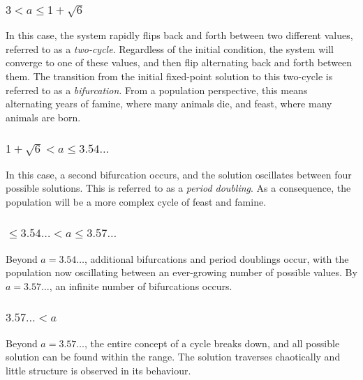 \subsubsection{$ 3 < a \leq 1 + \sqrt{6}$}
In this case, the system rapidly flips back and forth between two different values, referred to as a {\it two-cycle}. Regardless of the initial condition, the system will converge to one of these values, and then flip alternating back and forth between them. The transition from the initial fixed-point solution to this two-cycle is referred to as a {\it bifurcation}. From a population perspective, this means alternating years of famine, where many animals die, and feast, where many animals are born.

\subsubsection{$1 + \sqrt{6} < a \leq 3.54\hdots$}
In this case, a second bifurcation occurs, and the solution oscillates between four possible solutions. This is referred to as a {\it period doubling}. As a consequence, the population will be a more complex cycle of feast and famine.

\subsubsection{$\leq 3.54\hdots < a \leq 3.57\hdots$}
Beyond $a = 3.54\hdots$, additional bifurcations and period doublings occur, with the population now oscillating between an ever-growing number of possible values. By $a = 3.57\hdots$, an infinite number of bifurcations occurs. 

\subsubsection{$3.57\hdots < a $}
Beyond $a = 3.57\hdots$, the entire concept of a cycle breaks down, and all possible solution can be found within the range. The solution traverses chaotically and little structure is observed in its behaviour. 

